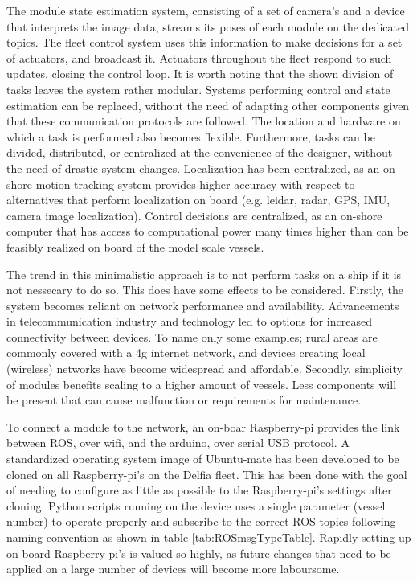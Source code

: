 The module state estimation system, consisting of a set of camera's and a device that interprets the image data, streams its poses of each module on the dedicated topics. The fleet control system uses this information to make decisions for a set of actuators, and broadcast it. Actuators throughout the fleet respond to such updates, closing the control loop. It is worth noting that the shown division of tasks leaves the system rather modular. Systems performing control and state estimation can be replaced, without the need of adapting other components given that these communication protocols are followed. The location and hardware on which a task is performed also becomes flexible. Furthermore, tasks can be divided, distributed, or centralized at the convenience of the designer, without the need of drastic system changes. Localization has been centralized, as an on-shore motion tracking system provides higher accuracy with respect to alternatives that perform localization on board (e.g. leidar, radar, GPS, IMU, camera image localization). Control decisions are centralized, as an on-shore computer that has access to computational power many times higher than can be feasibly realized on board of the model scale vessels. 

The trend in this minimalistic approach is to not perform tasks on a ship if it is not nessecary to do so. This does have some effects to be considered. Firstly, the system becomes reliant on network performance and availability. Advancements in telecommunication industry and technology led to options for increased connectivity between devices. To name only some examples; rural areas are commonly covered with a 4g internet network, and devices creating local (wireless) networks have become widespread and affordable. Secondly, simplicity of modules benefits scaling to a higher amount of vessels. Less components will be present that can cause malfunction or requirements for maintenance. 

To connect a module to the network, an on-boar Raspberry-pi provides the link between ROS, over wifi, and the arduino, over serial USB protocol. A standardized operating system image of Ubuntu-mate has been developed to be cloned on all Raspberry-pi's on the Delfia fleet. This has been done with the goal of needing to configure as little as possible to the Raspberry-pi's settings after cloning. Python scripts running on the device uses a single parameter (vessel number) to operate properly and subscribe to the correct ROS topics following naming convention as shown in table \ref{tab:ROSmsgTypeTable}. Rapidly setting up on-board Raspberry-pi's is valued so highly, as future changes that need to be applied on a large number of devices will become more laboursome. 

